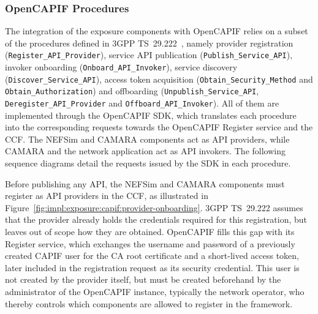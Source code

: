 \subsubsection{Open\acs{CAPIF} Procedures}
\label{chap:impl:exposure:capif:procedures}

{\setlength{\emergencystretch}{3em}%
The integration of the exposure components with Open\acs{CAPIF} relies on a subset of the procedures defined in \acs{3GPP} TS~29.222~\cite{ETSI_CAPIF_TS_129_222_V18_6_0}, namely provider registration (\texttt{Register\_\allowbreak API\_\allowbreak Provider}), service \acs{API} publication (\texttt{Publish\_\allowbreak Service\_\allowbreak API}), invoker onboarding (\texttt{Onboard\_\allowbreak API\_\allowbreak Invoker}), service discovery (\texttt{Discover\_\allowbreak Service\_\allowbreak API}), access token acquisition (\texttt{Obtain\_\allowbreak Security\_\allowbreak Method} and \texttt{Obtain\_\allowbreak Authorization}) and offboarding (\texttt{Unpublish\_\allowbreak Service\_\allowbreak API}, \texttt{Deregister\_\allowbreak API\_\allowbreak Provider} and \texttt{Offboard\_\allowbreak API\_\allowbreak Invoker}). All of them are implemented through the Open\acs{CAPIF} \acs{SDK}, which translates each procedure into the corresponding requests towards the Open\acs{CAPIF} Register service and the \acs{CCF}. The \acs{NEF}Sim and CAMARA components act as \acs{API} providers, while CAMARA and the network application act as \acs{API} invokers. The following sequence diagrams detail the requests issued by the \acs{SDK} in each procedure.\par}


Before publishing any \acs{API}, the \acs{NEF}Sim and CAMARA components must register as \acs{API} providers in the \acs{CCF}, as illustrated in Figure~\ref{fig:impl:exposure:capif:provider-onboarding}. \acs{3GPP} TS~29.222 assumes that the provider already holds the credentials required for this registration, but leaves out of scope how they are obtained. Open\acs{CAPIF} fills this gap with its Register service, which exchanges the username and password of a previously created \acs{CAPIF} user for the \acs{CA} root certificate and a short-lived access token, later included in the registration request as its security credential. This user is not created by the provider itself, but must be created beforehand by the administrator of the Open\acs{CAPIF} instance, typically the network operator, who thereby controls which components are allowed to register in the framework.

